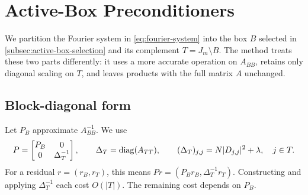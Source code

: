 \section{Active-Box Preconditioners}
\label{sec:main-algorithms}
We partition the Fourier system in \cref{eq:fourier-system} into the box
\(B\) selected in \cref{subsec:active-box-selection} and its complement
\(T=J_m\setminus B\). The method treats these two parts differently: it uses
a more accurate operation on \(A_{BB}\), retains only diagonal scaling on
\(T\), and leaves products with the full matrix \(A\) unchanged.





\subsection{Block-diagonal form}
\label{subsec:block-diagonal-active-preconditioner}

Let \(P_B\) approximate \(A_{BB}^{-1}\). We use
\[
    P
    =
    \begin{bmatrix}
        P_B & 0 \\
        0 & \Delta_T^{-1}
    \end{bmatrix},
    \qquad
    \Delta_T=\operatorname{diag}(A_{TT}),
    \qquad
    (\Delta_T)_{j,j}=N |D_{j,j}|^2+\lambda,
    \quad j\in T.
\]
For a residual \(r=(r_B,r_T)\), this means
\(Pr=(P_Br_B,\Delta_T^{-1}r_T)\).
Constructing and applying \(\Delta_T^{-1}\) each cost \(O(|T|)\). The
remaining cost depends on \(P_B\).



